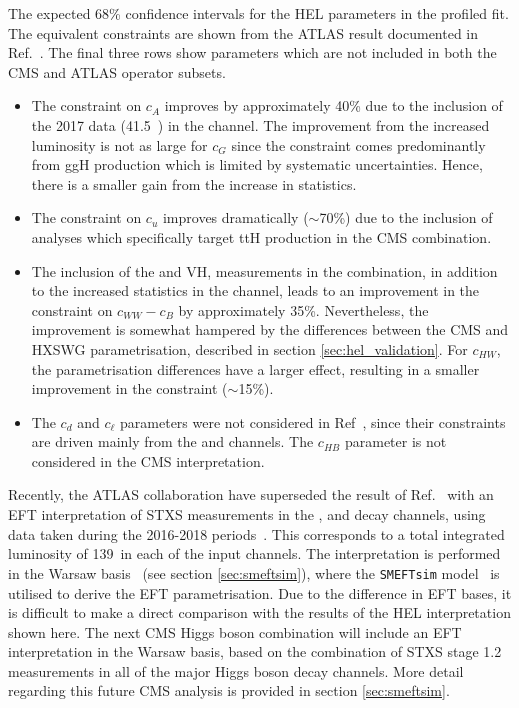 \begin{table}[htb]
  \centering
  \renewcommand{\arraystretch}{1.3}
  \setlength{\tabcolsep}{15pt}
  \caption[Comparison to the HEL parameter constraints from a previous ATLAS result]
  {
    The expected 68\% confidence intervals for the HEL parameters in the profiled fit. The equivalent constraints are shown from the ATLAS result documented in Ref.~\cite{ATL-PHYS-PUB-2017-018}. The final three rows show parameters which are not included in both the CMS and ATLAS operator subsets.
  }
  \label{tab:hel_atlas}
  
\end{table}

\begin{itemize}
    \item The constraint on $c_A$ improves by approximately 40\% due to the inclusion of the 2017 data (41.5~\fbinv) in the \Hgg channel. The improvement from the increased luminosity is not as large for $c_G$ since the constraint comes predominantly from ggH production which is limited by systematic uncertainties. Hence, there is a smaller gain from the increase in statistics.
    \item The constraint on $c_u$ improves dramatically ($\sim$70\%) due to the inclusion of analyses which specifically target ttH production in the CMS combination. 
    \item The inclusion of the \HWW and VH, \Hbb measurements in the combination, in addition to the increased statistics in the \Hfl channel, leads to an improvement in the constraint on $c_{WW}-c_B$ by approximately 35\%. Nevertheless, the improvement is somewhat hampered by the differences between the CMS and HXSWG parametrisation, described in section \ref{sec:hel_validation}. For $c_{HW}$, the parametrisation differences have a larger effect, resulting in a smaller improvement in the constraint ($\sim$15\%).
    \item The $c_d$ and $c_\ell$ parameters were not considered in Ref~\cite{ATL-PHYS-PUB-2017-018}, since their constraints are driven mainly from the \Hbb and \Htautau channels. The $c_{HB}$ parameter is not considered in the CMS interpretation.
\end{itemize}

Recently, the ATLAS collaboration have superseded the result of Ref.~\cite{ATL-PHYS-PUB-2017-018} with an EFT interpretation of STXS measurements in the \Hbb, \Hgg and \Hfl decay channels, using data taken during the 2016-2018 periods~\cite{ATLAS-CONF-2020-053}. This corresponds to a total integrated luminosity of 139~\fbinv in each of the input channels. The interpretation is performed in the Warsaw basis~\cite{Grzadkowski:2010es} (see section \ref{sec:smeftsim}), where the \texttt{SMEFTsim} model~\cite{Brivio:2017btx} is utilised to derive the EFT parametrisation. Due to the difference in EFT bases, it is difficult to make a direct comparison with the results of the HEL interpretation shown here. The next CMS Higgs boson combination will include an EFT interpretation in the Warsaw basis, based on the combination of STXS stage 1.2 measurements in all of the major Higgs boson decay channels. More detail regarding this future CMS analysis is provided in section \ref{sec:smeftsim}.

